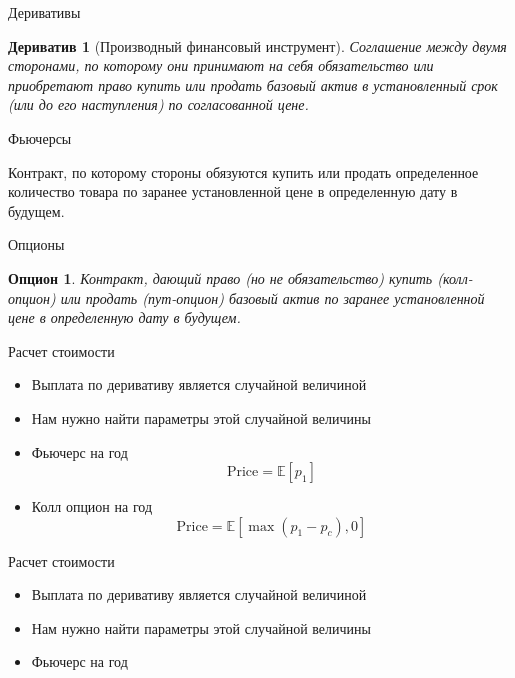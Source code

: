 \documentclass{beamer}
\newtheorem{derivative*}{Дериватив}
\newtheorem{option*}{Опцион}
\newcommand{\E}{\ensuremath{\mathbb{E}}}
\begin{document}
        \begin{frame}{Деривативы}
            \begin{derivative*}[Производный финансовый инструмент]
                Соглашение между двумя сторонами, по которому они принимают на себя обязательство или приобретают право купить или продать базовый актив в установленный срок (или до его наступления) по согласованной цене.
            \end{derivative*}
        \end{frame}

        \begin{frame}{Фьючерсы}
            \begin{futures*}
                Контракт, по которому стороны обязуются купить или продать определенное количество товара по заранее установленной цене в определенную дату в будущем.
            \end{futures*}
        \end{frame}

        \begin{frame}{Опционы}
            \begin{option*}
                Контракт, дающий право (но не обязательство) купить (колл-опцион) или продать (пут-опцион) базовый актив по заранее установленной цене в определенную дату в будущем.
            \end{option*}
        \end{frame}

        \begin{frame}{Расчет стоимости}
            \begin{itemize}
                \item Выплата по деривативу является случайной величиной
                \item Нам нужно найти параметры этой случайной величины
            \end{itemize}
            \begin{itemize}
                \item Фьючерс на год
                \[
                    \mathrm{Price} = \E \left[ p_1 \right]
                \]
                \item Колл опцион на год
                \[
                    \mathrm{Price} = \E \left[ \max{(p_1 - p_c), 0} \right]
                \]
            \end{itemize}
        \end{frame}

        \begin{frame}{Расчет стоимости}
            \begin{itemize}
                \item Выплата по деривативу является случайной величиной
                \item Нам нужно найти параметры этой случайной величины
            \end{itemize}
            \begin{itemize}
                \item Фьючерс на год
            \end{itemize}
        \end{frame}
\end{document}
